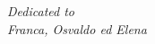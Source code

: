 %
%
\begin{center}
\vspace*{80mm}
\Large \em
Dedicated to\vspace{2mm}\\
Franca, Osvaldo ed Elena
\normalsize \rm
\end{center}
\newpage
